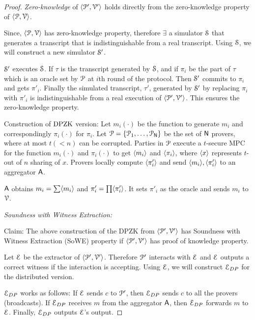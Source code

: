 \begin{proof}
	\textit{Zero-knowledge} of $\langle \mathcal{P}', \mathcal{V}' \rangle$ holds directly from the zero-knowledge property of $\langle \mathcal{P}, \mathcal{V} \rangle$. 
	
	Since, $\langle \mathcal{P}, \mathcal{V} \rangle$ has zero-knowledge property, therefore $\exists$ a simulator $\mathcal{S}$ that generates a transcript that is indistinguishable from a real transcript. Using $\mathcal{S}$, we will construct a new simulator $\mathcal{S}'$. 
	
	$\mathcal{S}'$ executes $\mathcal{S}$. If $\tau$ is the transcript generated by $\mathcal{S}$, and if $\pi_i$ be the part of $\tau$ which is an oracle set by $\mathcal{P}$ at $i$th round of the protocol. Then $\mathcal{S}'$ commits to $\pi_i$ and gets $\pi'_i$. Finally the simulated transcript, $\tau'$, generated by $\mathcal{S}'$ by replacing $\pi_i$ with $\pi'_i$ is indistinguishable from a real execution of $\langle \mathcal{P}', \mathcal{V}' \rangle$. This ensures the zero-knowledge property.
	
	Construction of $\text{DPZK}$ version: Let $m_i(\cdot)$ be the function to generate $m_i$ and correspondingly $\pi_i(\cdot)$ for $\pi_i$. Let $\mathcal{P} = \{\mathcal{P}_{1}, \ldots, \mathcal{P}_{\mathsf{N}}\}$ be the set of $\mathsf{N}$ provers, where at most $t (<n)$ can be corrupted. Parties in $\mathcal{P}$ execute a $t$-secure MPC for the function $m_i(\cdot)$ and $\pi_i(\cdot)$ to get $\langle m_i \rangle$ and $\langle \pi_i \rangle$, where $\langle x \rangle$ represents $t$-out of $n$ sharing of $x$. Provers locally compute $\langle \pi'_i \rangle$ and send $\langle m_i \rangle, \langle \pi'_i \rangle$ to an aggregator $\mathsf{A}$.
	
	$\mathsf{A}$ obtains $m_i = \sum \langle m_i \rangle$ and $\pi'_i = \prod \langle \pi'_i \rangle$. It sets $\pi'_i$ as the oracle and sends $m_i$ to $\mathcal{V}$.
	
	\textit{Soundness with Witness Extraction:}
	
	Claim: The above construction of the DPZK from $\langle \mathcal{P}', \mathcal{V}' \rangle$ has Soundness with Witness Extraction (SoWE) property if $\langle \mathcal{P}', \mathcal{V}' \rangle$ has proof of knowledge property. 
	
	Let $\mathcal{E}$ be the extractor of $\langle \mathcal{P}', \mathcal{V}' \rangle$. Therefore $\mathcal{P}'$ interacts with $\mathcal{E}$ and $\mathcal{E}$ outputs a correct witness if the interaction is accepting. Using $\mathcal{E}$, we will construct $\mathcal{E}_{DP}$ for the distributed version.
	
	$\mathcal{E}_{DP}$ works as follows:
	If $\mathcal{E}$ sends $c$ to $\mathcal{P}'$, then $\mathcal{E}_{DP}$ sends $c$ to all the provers (broadcasts).
	If $\mathcal{E}_{DP}$ receives $m$ from the aggregator $\mathsf{A}$, then $\mathcal{E}_{DP}$ forwards $m$ to $\mathcal{E}$. 
	Finally, $\mathcal{E}_{DP}$ outputs $\mathcal{E}$'s output.
	

\end{proof}
